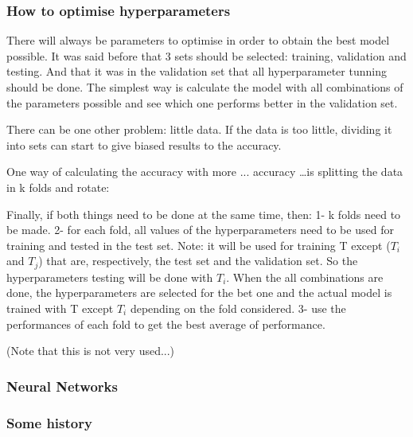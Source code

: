 

\subsubsection{How to optimise hyperparameters}
There will always be parameters to optimise in order to obtain the best model possible.
It was said before that 3 sets should be selected: training, validation and testing.
And that it was in the validation set that all hyperparameter tunning should be done.
The simplest way is calculate the model with all combinations of the parameters possible and see which one performs better in the validation set. 

There can be one other problem: little data. If the data is too little, dividing it into sets can start to give biased results to the accuracy.

One way of calculating the accuracy with more ... accuracy \dots is splitting the data in k folds and rotate:




Finally, if both things need to be done at the same time, then:
1- k folds need to be made. 
2- for each fold, all values of the hyperparameters need to be used for training and tested in the test set.
Note: it will be used for training T except ($T_i$ and $T_j$) that are, respectively, the test set and the validation set. So the hyperparameters testing will be done with $T_i$.
When the all combinations are done, the hyperparameters are selected for the bet one and the actual model is trained with T except $T_i$ depending on the fold considered.
3- use the performances of each fold to get the best average of performance.

(Note that this is not very used...)








\subsubsection{Neural Networks}


\subsubsection*{Some history}

